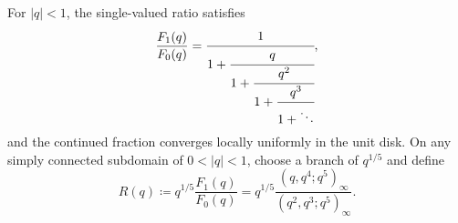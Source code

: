 \begin{theorem}
\label{qg:thm-rrcf}
For \(|q|<1\), the single-valued ratio satisfies
\begin{equation}
 \frac{F_1(q)}{F_0(q)}
 =
 \cfrac{1}{
  1+\cfrac{q}{
  1+\cfrac{q^2}{
  1+\cfrac{q^3}{1+\ddots}}}},
 \label{qg:eq:rogers-ramanujan-fraction}
\end{equation}
and the continued fraction converges locally uniformly in the unit disk.
On any simply connected subdomain of \(0<|q|<1\), choose a branch of
\(q^{1/5}\) and define
\begin{equation}
 R(q)
 \coloneqq q^{1/5}\frac{F_1(q)}{F_0(q)}
 =
 q^{1/5}
 \frac{(q,q^4;q^5)_\infty}
      {(q^2,q^3;q^5)_\infty}.
 \label{qg:eq:rogers-ramanujan-fraction-product}
\end{equation}
\end{theorem}

